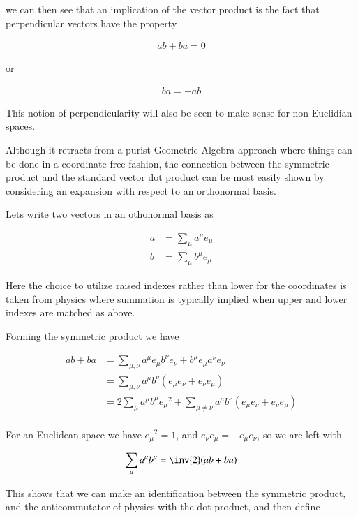 \documentclass{article}
\begin{document}
we can then see that an implication of the vector product is the fact that perpendicular vectors have the property

\begin{align*}
a b + ba = 0
\end{align*}

or

\begin{align*}
b a = - a b
\end{align*}

This notion of perpendicularity will also be seen to make sense for non-Euclidian spaces.

Although it retracts from a purist Geometric Algebra approach where things can be done in a coordinate free fashion, the connection between the symmetric product and the standard vector dot product can be most easily shown by considering an expansion with respect to an orthonormal basis.

Lets write two vectors in an othonormal basis as

\begin{align*}
a &= \sum_\mu a^\mu e_\mu \\
b &= \sum_\mu b^\mu e_\mu
\end{align*}

Here the choice to utilize raised indexes rather than lower for the coordinates is taken from physics where summation is typically implied when upper and lower indexes are matched as above.

Forming the symmetric product we have

\begin{align*}
a b + b a
&=
\sum_{\mu,\nu} a^\mu e_\mu b^\nu e_\nu + b^\mu e_\mu a^\nu e_\nu \\
&=
\sum_{\mu,\nu} a^\mu b^\nu \left( e_\mu e_\nu + e_\nu e_\mu \right) \\
&=
2 \sum_{\mu} a^\mu b^\mu {e_\mu}^2 + \sum_{\mu \ne \nu} a^\mu b^\nu \left( e_\mu e_\nu + e_\nu e_\mu \right) \\
\end{align*}

For an Euclidean space we have ${e_\mu}^2 = 1$, and $e_\nu e_\mu = -e_\mu e_\nu$, so we are left with

\begin{align*}
\sum_{\mu} a^\mu b^\mu = \inv{2} ( a b + b a)
\end{align*}

This shows that we can make an identification between the symmetric product, and the anticommutator of physics with the dot product, and then define
\end{document}
